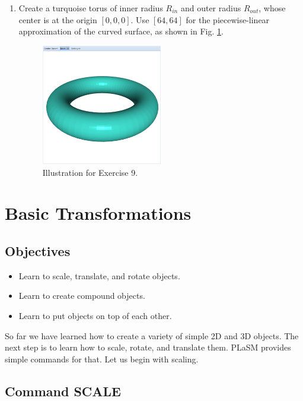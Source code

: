 \documentclass{article}
\begin{document}
\begin{enumerate}
\item Create a turquoise torus of inner radius $R_{in}$ and outer radius $R_{out}$, whose center 
is at the origin $[0, 0, 0]$. Use $[64, 64]$ for the piecewise-linear approximation 
of the curved surface, as shown in Fig. \ref{fig:a9}.


\begin{figure}[!ht]
\begin{center}
\includegraphics[width=0.5\textwidth]{img/a9-turquoise-torus.png}
\end{center}
\vspace{-2mm}
\caption{Illustration for Exercise 9.}
\label{fig:a9}
\vspace{-1cm}
\end{figure}

\end{enumerate}

\section{Basic Transformations}

\subsection{Objectives}
\begin{itemize}
\item Learn to scale, translate, and rotate objects.
\item Learn to create compound objects.
\item Learn to put objects on top of each other.
\end{itemize}
So far we have learned how to create a variety of simple 2D and 3D objects. 
The next step is to learn how to scale, rotate, and translate them. PLaSM
provides simple commands for that. Let us begin with scaling.

\subsection{Command SCALE}
\end{document}
